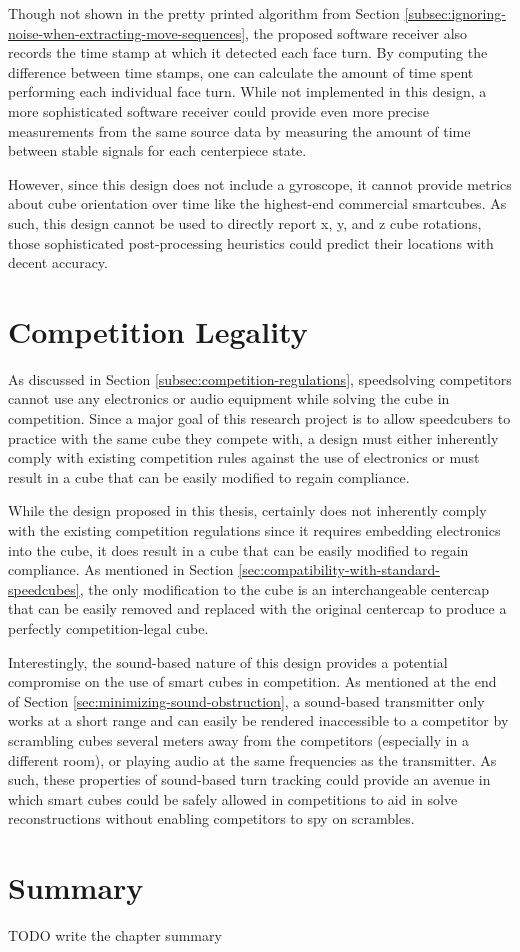Though not shown in the pretty printed algorithm from Section
\ref{subsec:ignoring-noise-when-extracting-move-sequences}, the
proposed software receiver also records the time stamp at which it
detected each face turn. By computing the difference between time
stamps, one can calculate the amount of time spent performing each
individual face turn. While not implemented in this design, a more
sophisticated software receiver could provide even more precise
measurements from the same source data by measuring the amount of time
between stable signals for each centerpiece state.

However, since this design does not include a gyroscope, it cannot
provide metrics about cube orientation over time like the highest-end
commercial smartcubes. As such, this design cannot be used to directly
report x, y, and z cube rotations, those sophisticated post-processing
heuristics could predict their locations with decent accuracy.


\section{Competition Legality}
\label{sec:competition-legality}

As discussed in Section \ref{subsec:competition-regulations},
speedsolving competitors cannot use any electronics or audio equipment
while solving the cube in competition. Since a major goal of this
research project is to allow speedcubers to practice with the same cube
they compete with, a design must either inherently comply with existing
competition rules against the use of electronics or must result in a
cube that can be easily modified to regain compliance.

While the design proposed in this thesis, certainly does not inherently
comply with the existing competition regulations since it requires
embedding electronics into the cube, it does result in a cube that can
be easily modified to regain compliance. As mentioned in Section
\ref{sec:compatibility-with-standard-speedcubes}, the only modification
to the cube is an interchangeable centercap that can be easily removed
and replaced with the original centercap to produce a perfectly
competition-legal cube.

Interestingly, the sound-based nature of this design provides a
potential compromise on the use of smart cubes in competition. As
mentioned at the end of Section \ref{sec:minimizing-sound-obstruction},
a sound-based transmitter only works at a short range and can easily be
rendered inaccessible to a competitor by scrambling cubes several
meters away from the competitors (especially in a different room), or
playing audio at the same frequencies as the transmitter. As such,
these properties of sound-based turn tracking could provide an avenue
in which smart cubes could be safely allowed in competitions to aid in
solve reconstructions without enabling competitors to spy on scrambles.

\section{Summary}
TODO write the chapter summary

